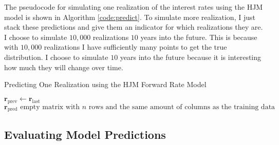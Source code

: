 \noindent The pseudocode for simulating one realization of the interest rates using the HJM model is shown in Algorithm \ref{code:predict}. To simulate more realization, I just stack these predictions and give them an indicator for which realizations they are. I choose to simulate $10,000$ realizations $10$ years into the future. This is because with $10,000$ realizations I have sufficiently many points to get the true distribution. I choose to simulate $10$ years into the future because it is interesting how much they will change over time.

\newpage

\begin{algorithm}[!htbp]
\caption{Predicting One Realization using the HJM Forward Rate Model}\label{alg:pred hjm}

$\boldsymbol{r}_{\text{prev}}\gets \boldsymbol{r}_{\text{last}}$\;
$\mathbf{r}_\text{pred} \text{ empty matrix with $n$ rows and the same amount of columns as the training data}$\;
\label{code:predict}
\end{algorithm}

\subsection{Evaluating Model Predictions}

